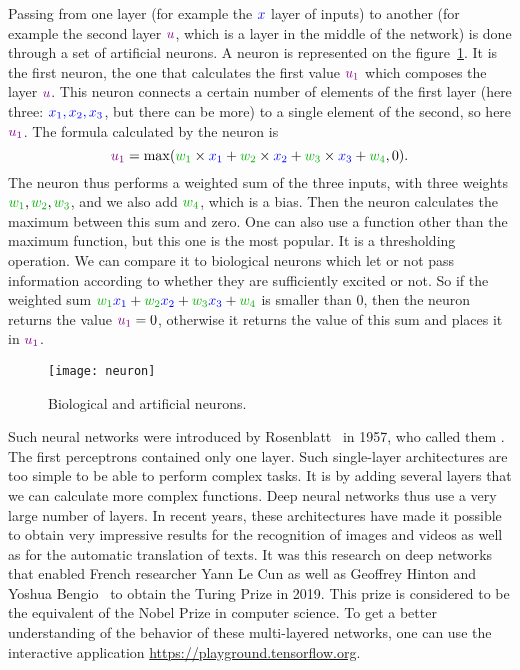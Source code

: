 Passing from one layer (for example the ${\color{blue} x}$ layer of inputs) to another (for example the second layer ${\color[rgb]{.5,0,.5} u}$, which is a  layer in the middle of the network) is done through a set of artificial neurons. A neuron is represented on the figure~\ref{fig:neuron}. It is the first neuron, the one that calculates the first value ${\color[rgb]{.5,0,.5} u_1}$ which composes the layer ${\color[rgb]{.5,0,.5} u}$. This neuron connects a certain number of elements of the first layer (here three: ${\color{blue} x_1, x_2, x_3}$, but there can be more) to a single element of the second, so here ${\color[rgb]{.5,0,.5} u_1}$. The formula calculated by the neuron is
$$
	{\color[rgb]{.5,0,.5} u_1} = \max( \mygreen{w_1} \times \myblue{x_1} + \mygreen{w_2} \times \myblue{x_2} + \mygreen{w_3} \times \myblue{x_3} + \mygreen{w_4}, 0).
$$
The neuron thus performs a weighted sum of the three inputs, with three weights $\mygreen{w_1}, \mygreen{w_2}, \mygreen{w_3}$, and we also add $\mygreen{w_4}$, which is a bias. Then the neuron calculates the maximum between this sum and zero. One can also use a function other than the maximum function, but this one is the most popular. It is a thresholding operation. We can compare it to biological neurons which let or not pass information according to whether they are sufficiently excited or not.
%
So if the weighted sum $\mygreen{w_1} {\color{blue} x_1} + \mygreen{w_2} {\color{blue} x_2} + \mygreen{w_3} {\color{blue} x_3} + \mygreen{w_4}$ is smaller than 0, then the neuron returns the value ${\color[rgb]{.5,0,.5} u_1} = 0$, otherwise it returns the value of this sum and places it in ${\color[rgb]{.5,0,.5} u_1}$.


\begin{figure}\centering
	\texttt{[image: neuron]}
\caption{\label{fig:neuron} Biological and artificial neurons. }
\end{figure}

Such neural networks were introduced by Rosenblatt~\cite{rosenblatt1957perceptron} in 1957, who called them . The first perceptrons contained only one layer.
%
%
Such single-layer architectures are too simple to be able to perform complex tasks. It is by adding several layers that we can calculate more complex functions.
%
Deep neural networks thus use a very large number of layers. In recent years, these architectures have made it possible to obtain very impressive results for the recognition of images and videos as well as for the automatic translation of texts. It was this research on deep networks that enabled French researcher Yann Le Cun as well as Geoffrey Hinton and Yoshua Bengio~\cite{lecun2015deep} to obtain the Turing Prize in 2019. This prize is considered to be the equivalent of the Nobel Prize in computer science.
%
To get a better understanding of the behavior of these multi-layered networks, one can use the interactive application \url{https://playground.tensorflow.org}.

